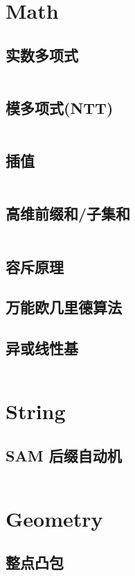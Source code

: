 \begin{multicols}{2}
\begin{spacing}{0.6}
			\section{Math}
				\subsection{实数多项式}
					\inputminted{cpp}{Math/poly.cpp}
				\subsection{模多项式(NTT)}
					\inputminted{cpp}{Math/polyMod.cpp}
				\subsection{插值}
					
					\inputminted{cpp}{Math/interp_lagrange.cpp}
				\subsection{高维前缀和/子集和}
					\inputminted{cpp}{Math/subsetsum.cpp}
				\subsection{容斥原理}
					
				\subsection{万能欧几里德算法}
					
				\subsection{异或线性基}
					\inputminted{cpp}{Math/linear_basis.cpp}
			

			\columnbreak
			\section{String}
				\subsection{SAM 后缀自动机}
					\inputminted{cpp}{String/sam.cpp}
			


			\section{Geometry}
				\subsection{整点凸包}
					\inputminted{cpp}{Geometry/geometry.cpp}
			

\end{spacing}
\end{multicols}
